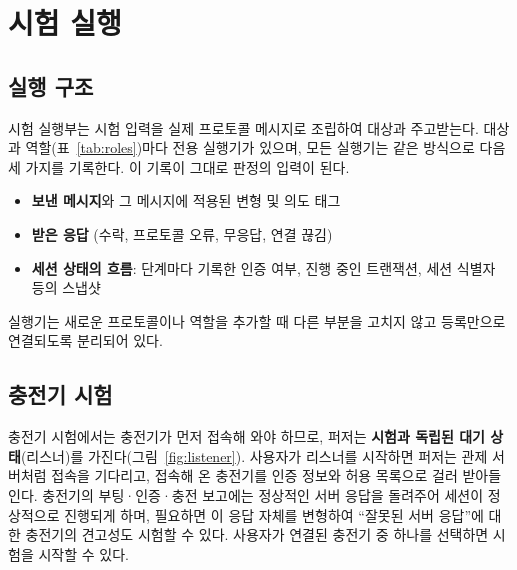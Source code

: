 \clearpage

\section{시험 실행}\label{sec:runners}

\subsection{실행 구조}

시험 실행부는 시험 입력을 실제 프로토콜 메시지로 조립하여 대상과 주고받는다.
대상과 역할(표~\ref{tab:roles})마다 전용 실행기가 있으며, 모든 실행기는 같은 방식으로 다음 세 가지를 기록한다.
이 기록이 그대로 판정의 입력이 된다.

\begin{itemize}
    \item \textbf{보낸 메시지}와 그 메시지에 적용된 변형 및 의도 태그
    \item \textbf{받은 응답} (수락, 프로토콜 오류, 무응답, 연결 끊김)
    \item \textbf{세션 상태의 흐름}: 단계마다 기록한 인증 여부, 진행 중인 트랜잭션, 세션 식별자 등의 스냅샷
\end{itemize}

실행기는 새로운 프로토콜이나 역할을 추가할 때 다른 부분을 고치지 않고 등록만으로 연결되도록 분리되어 있다.

\subsection{충전기 시험}\label{subsec:listener}

충전기 시험에서는 충전기가 먼저 접속해 와야 하므로, 퍼저는 \textbf{시험과 독립된 대기 상태}(리스너)를 가진다(그림~\ref{fig:listener}).
사용자가 리스너를 시작하면 퍼저는 관제 서버처럼 접속을 기다리고, 접속해 온 충전기를 인증 정보와 허용 목록으로 걸러 받아들인다.
충전기의 부팅·인증·충전 보고에는 정상적인 서버 응답을 돌려주어 세션이 정상적으로 진행되게 하며, 필요하면 이 응답 자체를 변형하여 ``잘못된 서버 응답''에 대한 충전기의 견고성도 시험할 수 있다.
사용자가 연결된 충전기 중 하나를 선택하면 시험을 시작할 수 있다.

